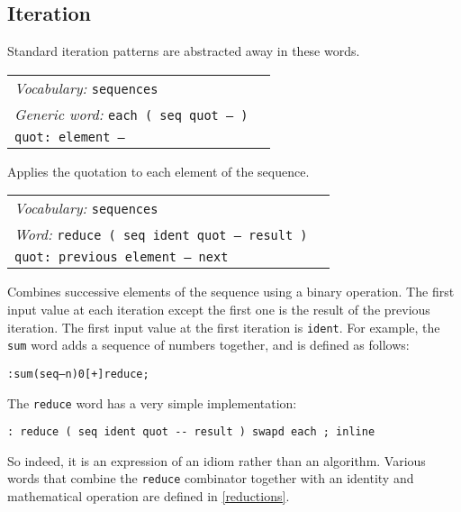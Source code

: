 \documentclass{book}
\newcommand{\vocabulary}[1]{\emph{Vocabulary:} \texttt{#1}&\\}
\newcommand{\ordinaryword}[2]{\index{\texttt{#1}}\emph{Word:} \texttt{#2}&\\}
\newcommand{\genericword}[2]{\index{\texttt{#1}}\emph{Generic word:} \texttt{#2}&\\}
\newcommand{\wordtable}[1]{


\begin{tabularx}{12cm}{lX}
\hline
#1
\hline
\end{tabularx}

}
\begin{document}
\subsection{Iteration}\label{iteration}

Standard iteration patterns are abstracted away in these words.

\wordtable{
\vocabulary{sequences}
\genericword{each}{each ( seq quot -- )}
\texttt{quot:~element --}\\
}
Applies the quotation to each element of the sequence.
\wordtable{
\vocabulary{sequences}
\ordinaryword{reduce}{reduce ( seq ident quot -- result )}
\texttt{quot:~previous element -- next}\\
}
Combines successive elements of the sequence using a binary operation. The first input value at each iteration except the first one is the result of the previous iteration. The first input value at the first iteration is \verb|ident|. For example, the \verb|sum| word adds a sequence of numbers together, and is defined as follows:
\begin{alltt}
: sum ( seq -- n ) 0 [ + ] reduce ;
\end{alltt}
The \verb|reduce| word has a very simple implementation:
\begin{verbatim}
: reduce ( seq ident quot -- result ) swapd each ; inline
\end{verbatim}
So indeed, it is an expression of an idiom rather than an algorithm. Various words that combine the \verb|reduce| combinator together with an identity and mathematical operation are defined in \ref{reductions}.
\end{document}

